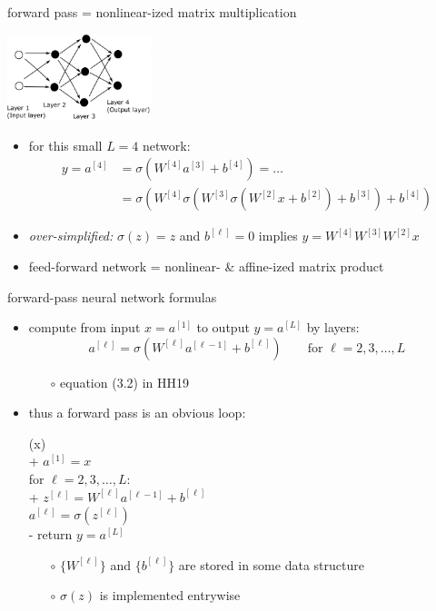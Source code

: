 \documentclass[xcolor={svgnames},
               hyperref={colorlinks,citecolor=DeepPink4,linkcolor=FireBrick,urlcolor=Maroon}]
               {beamer}
\begin{document}
\begin{frame}{forward pass = nonlinear-ized matrix multiplication}

\begin{center}
\includegraphics[height=25mm]{figs/network}
\end{center}

\begin{itemize}
\item for this small $L=4$ network:
\begin{align*}
y = a^{[4]} &= \sigma\left(W^{[4]} a^{[3]} + b^{[4]}\right) = \dots \\
            &= \sigma\left(W^{[4]} \sigma\left(W^{[3]} \sigma\left(W^{[2]} x + b^{[2]}\right) + b^{[3]}\right) + b^{[4]}\right)
\end{align*}
\item \emph{over-simplified:} $\sigma(z)=z$ and $b^{[\ell]}=0$ implies $y = W^{[4]} W^{[3]} W^{[2]} x$
\item feed-forward network = nonlinear- \& affine-ized matrix product
\end{itemize}
\end{frame}


\begin{frame}{forward-pass neural network formulas}

\begin{itemize}
\item compute from input $x = a^{[1]}$ to output $y = a^{[L]}$ by layers:
    $$a^{[\ell]} = \sigma\left(W^{[\ell]} a^{[\ell-1]} + b^{[\ell]}\right) \qquad \text{for } \ell=2,3,\dots,L$$

    \begin{itemize}
    \item[$\circ$] equation (3.2) in HH19
    \end{itemize}
\item thus a forward pass is an obvious loop:

\begin{pseudo*}
(x)\text{:} \\+
    $a^{[1]} = x$ \\
    for $\ell = 2,3,\dots,L$: \\+
        $z^{[\ell]} = W^{[\ell]} a^{[\ell-1]} + b^{[\ell]}$ \\
        $a^{[\ell]} = \sigma\left(z^{[\ell]}\right)$ \\-
    return $y=a^{[L]}$
\end{pseudo*}

    \begin{itemize}
    \item[$\circ$] $\{W^{[\ell]}\}$ and $\{b^{[\ell]}\}$ are stored in some data structure
    \item[$\circ$] $\sigma(z)$ is implemented entrywise
    \end{itemize}
\end{itemize}
\end{frame}
\end{document}
